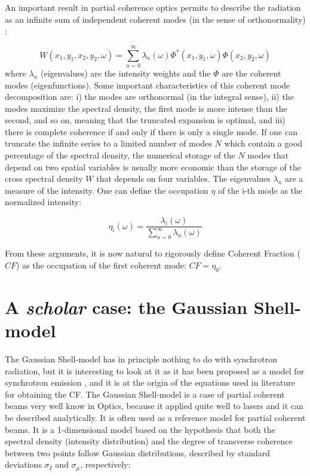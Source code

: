 \documentclass{iucr}              %
\begin{document}
An important result in partial coherence optics permits to describe the radiation as an infinite sum of independent coherent modes (in the sense of orthonormality) :

\begin{equation}
W(x_1,y_1,x_2,y_2,\omega) = \sum_{n=0}^{\infty} \lambda_n(\omega) \Phi^*(x_1,y_1,\omega) \Phi(x_2,y_2,\omega) 
\label{CMD}
\end{equation}
where $\lambda_n$ (eigenvalues) are the intensity weights and the $\Phi$ are the coherent modes (eigenfunctions). 
Some important characteristics of this coherent mode decomposition are: i) the modes are orthonormal (in the integral sense), ii) the modes maximize the spectral density, the first mode is more intense than the second, and so on, meaning that the truncated expansion is optimal, and iii) there is complete coherence if and only if there is only a single mode. If one can truncate the infinite series to a limited number of modes $N$ which contain a good percentage of the spectral density, the numerical storage of the $N$ modes that depend on two spatial variables is usually more economic than the storage of the cross spectral density $W$ that depends on four variables. 
The eigenvalues $\lambda_n$ are a measure of the intensity. One can define the occupation $\eta$ of the i-th mode as the normalized intensity: 

\begin{equation}
\eta_i(\omega) = \frac{\lambda_i(\omega)}{\sum_{n=0}^{\infty} \lambda_n(\omega)}
\end{equation}

From these arguments, it is now natural to rigorously define Coherent Fraction ($CF$) as the occupation of the first coherent mode: $CF=\eta_0$.


\section{A {\it scholar} case: the Gaussian Shell-model}

The Gaussian Shell-model has in principle nothing to do with synchrotron radiation, but it is interesting to look at it as it has been proposed as a model for synchrotron emission \cite{coisson1997,vartanyants2010}, and it is at the origin of the equations used in literature for obtaining the CF. The Gaussian Shell-model is a case of partial coherent beams very well know in Optics, because it applied quite well to lasers and it can be described analytically. It is often used as a reference model for partial coherent beams. It is a 1-dimensional model based on the hypothesis that both the spectral density (intensity distribution) and the degree of transverse coherence between two points follow Gaussian distributions, described by standard deviations $\sigma_I$ and $\sigma_{\mu}$, respectively:
\end{document}
